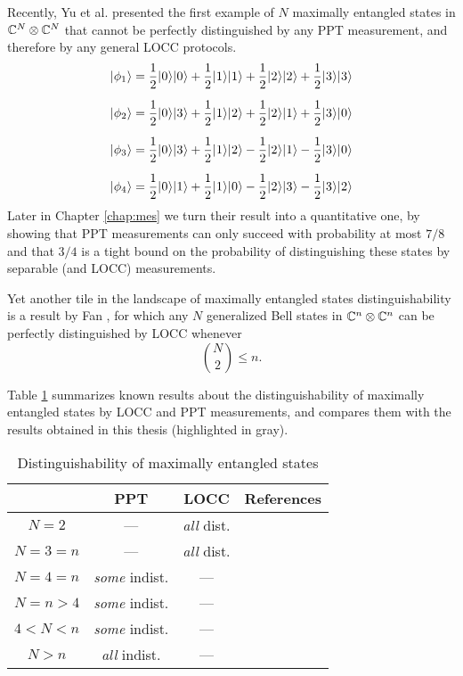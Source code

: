 Recently, Yu et al. \cite{Yu12} presented the first example of $N$ maximally 
entangled states in $\mathbb{C}^{N}\otimes\mathbb{C}^{N}$ that cannot be 
perfectly distinguished by any PPT measurement, and therefore by any general LOCC protocols.
\begin{equation}
  \label{eq:ydy_states}
  \begin{aligned}
    \ket{\phi_1} & =
    \frac{1}{2} \ket{0}\ket{0} + 
    \frac{1}{2} \ket{1}\ket{1} + 
    \frac{1}{2} \ket{2}\ket{2} + 
    \frac{1}{2} \ket{3}\ket{3} \\[2mm]
    \ket{\phi_2} & =
    \frac{1}{2} \ket{0}\ket{3} + 
    \frac{1}{2} \ket{1}\ket{2} + 
    \frac{1}{2} \ket{2}\ket{1} + 
    \frac{1}{2} \ket{3}\ket{0} \\[2mm]
    \ket{\phi_3} & =
    \frac{1}{2} \ket{0}\ket{3} +
    \frac{1}{2} \ket{1}\ket{2} - 
    \frac{1}{2} \ket{2}\ket{1} - 
    \frac{1}{2} \ket{3}\ket{0} \\[2mm]
    \ket{\phi_4} & =
    \frac{1}{2} \ket{0}\ket{1} + 
    \frac{1}{2} \ket{1}\ket{0} -
    \frac{1}{2} \ket{2}\ket{3} - 
    \frac{1}{2} \ket{3}\ket{2}
  \end{aligned}
\end{equation}
Later in Chapter \ref{chap:mes} we turn their result into a quantitative one,
by showing that PPT measurements can only succeed with probability at most $7/8$
and that $3/4$ is a tight bound on the probability of distinguishing these states 
by separable (and LOCC) measurements.

Yet another tile in the landscape of maximally entangled states distinguishability
is a result by Fan \cite{Fan04}, for which any $N$ generalized 
Bell states in $\mathbb{C}^{n}\otimes\mathbb{C}^{n}$ can be perfectly distinguished 
by LOCC whenever 
\[ 
  \binom{N}{2}\leq n.
\]

Table \ref{table:max-ent-states} summarizes known results about the
distinguishability of maximally entangled states by LOCC and PPT 
measurements, and compares them with the results obtained in this thesis 
(highlighted in gray). 

\begin{table}[!ht]
\centering
\def\arraystretch{1.5}
\begin{tabular}{|c|c|c|c|}
  \hline
    & PPT & LOCC & References\\
  \hline \hline
  $N = 2$     & --- & \emph{all} dist. & \cite{Walgate00}\\
  \hline
  $N = 3 = n$ & --- & \emph{all} dist. & \cite{Nathanson05}\\
  \hline 
  $N = 4 = n$ & \emph{some} indist. & --- & \cite{Yu12}\\
  \hline
  \rowcolor{Gray}
  $N = n > 4$ & \emph{some} indist. & --- & \cite{Cosentino13}\\
  \hline
  \rowcolor{Gray}
  $4 < N < n$ & \emph{some} indist. & --- & \cite{Cosentino14,Bandyopadhyay15}\\
  \hline
  $N > n$     & \emph{all} indist. & --- & \cite{Yu12,Duan09,Ghosh04} \\
  \hline
\end{tabular}
\caption{Distinguishability of maximally entangled states}
\label{table:max-ent-states}
\end{table}

